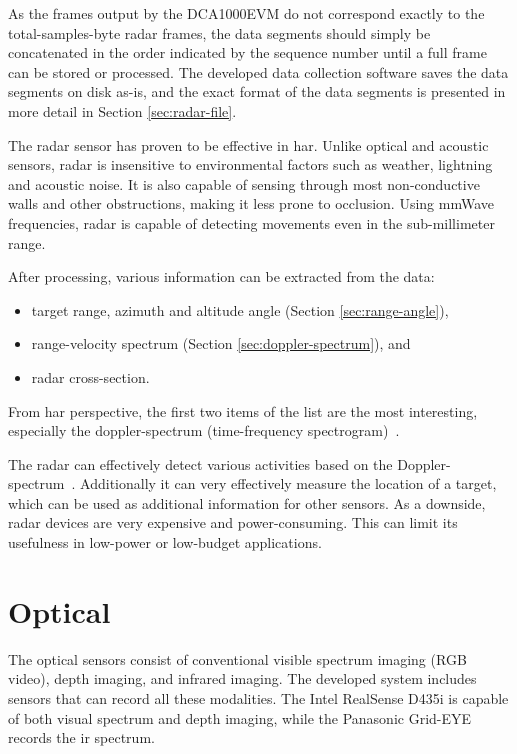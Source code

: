 As the frames output by the DCA1000EVM do not correspond exactly to the \gls{total-samples}-byte radar frames,
the data segments should simply be concatenated in the order indicated by the sequence number until a full frame can be stored or processed.
The developed data collection software saves the data segments on disk as-is,
and the exact format of the data segments is presented in more detail in Section \ref{sec:radar-file}.

The radar sensor has proven to be effective in \gls{har}.
Unlike optical and acoustic sensors,
radar is insensitive to environmental factors such as weather, lightning and acoustic noise.
It is also capable of sensing through most non-conductive walls and other obstructions,
making it less prone to occlusion.
Using \gls{mmWave} frequencies, radar is capable of detecting movements even in the sub-millimeter range.

After processing, various information can be extracted from the data:
\begin{itemize}
    \item target range, azimuth and altitude angle (Section \ref{sec:range-angle}),
    \item range-velocity spectrum (Section \ref{sec:doppler-spectrum}), and
    \item radar cross-section.
\end{itemize}
From \gls{har} perspective, the first two items of the list are the most interesting,
especially the doppler-spectrum (time-frequency spectrogram)~\cite{sensing-survey}.

The radar can effectively detect various activities based on the Doppler-spectrum~\cite{bumblebee-micro-doppler-har, seifert19, liu12, kim16}.
Additionally it can very effectively measure the location of a target,
which can be used as additional information for other sensors.
As a downside, radar devices are very expensive and power-consuming.
This can limit its usefulness in low-power or low-budget applications.

\section{Optical}
The optical sensors consist of conventional visible spectrum imaging (RGB video),
depth imaging, and infrared imaging.
The developed system includes sensors that can record all these modalities.
The Intel RealSense D435i is capable of both visual spectrum and depth imaging,
while the Panasonic Grid-EYE records the \gls{ir} spectrum.

